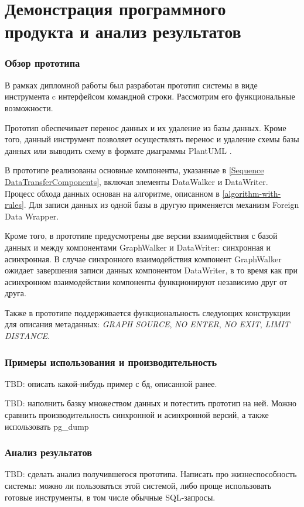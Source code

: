 \section{Демонстрация программного продукта и анализ результатов}

\subsubsection{Обзор прототипа}
В рамках дипломной работы был разработан прототип системы в виде инструмента c интерфейсом командной строки. Рассмотрим его функциональные возможности.

Прототип обеспечивает перенос данных и их удаление из базы данных. Кроме того, данный инструмент позволяет осуществлять перенос и удаление схемы базы данных или выводить схему в формате диаграммы PlantUML .

В прототипе реализованы основные компоненты, указанные в \ref{Sequence DataTransferComponents}, включая элементы DataWalker и DataWriter. Процесс обхода данных основан на алгоритме, описанном в \ref{algorithm-with-rules}. Для записи данных из одной базы в другую применяется механизм Foreign Data Wrapper.

Кроме того, в прототипе предусмотрены две версии взаимодействия с базой данных и между компонентами GraphWalker и DataWriter: синхронная и асинхронная. В случае синхронного взаимодействия компонент GraphWalker ожидает завершения записи данных компонентом DataWriter, в то время как при асинхронном взаимодействии компоненты функционируют независимо друг от друга.

Также в прототипе поддерживается функциональность следующих конструкции для описания метаданных: \textit{GRAPH SOURCE}, \textit{NO ENTER}, \textit{NO EXIT}, \textit{LIMIT DISTANCE}.

\subsubsection{Примеры использования и производительность}

TBD: описать какой-нибудь пример с бд, описанной ранее.

TBD: наполнить базку множеством данных и потестить прототип на ней. Можно сравнить производительность синхронной и асинхронной версий, а также использовать pg\_dump

\subsubsection{Анализ результатов}

TBD: сделать анализ получившегося прототипа. Написать про жизнеспособность системы: можно ли пользоваться этой системой, либо проще использовать готовые инструменты, в том числе обычные SQL-запросы.
